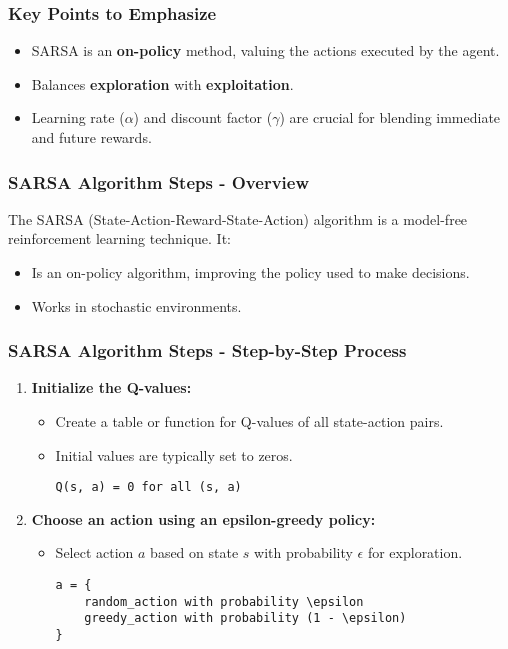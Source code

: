 \documentclass{beamer}
\begin{document}
\begin{frame}[fragile]
    \frametitle{Key Points to Emphasize}
    \begin{itemize}
        \item SARSA is an \textbf{on-policy} method, valuing the actions executed by the agent.
        \item Balances \textbf{exploration} with \textbf{exploitation}.
        \item Learning rate ($\alpha$) and discount factor ($\gamma$) are crucial for blending immediate and future rewards.
    \end{itemize}
\end{frame}

\begin{frame}[fragile]
    \frametitle{SARSA Algorithm Steps - Overview}
    The SARSA (State-Action-Reward-State-Action) algorithm is a model-free reinforcement learning technique. It:
    \begin{itemize}
        \item Is an on-policy algorithm, improving the policy used to make decisions.
        \item Works in stochastic environments.
    \end{itemize}
\end{frame}

\begin{frame}[fragile]
    \frametitle{SARSA Algorithm Steps - Step-by-Step Process}
    \begin{enumerate}
        \item \textbf{Initialize the Q-values:}
            \begin{itemize}
                \item Create a table or function for Q-values of all state-action pairs.
                \item Initial values are typically set to zeros.
                \begin{lstlisting}
Q(s, a) = 0 for all (s, a)
                \end{lstlisting}
            \end{itemize}
        \item \textbf{Choose an action using an epsilon-greedy policy:}
            \begin{itemize}
                \item Select action $a$ based on state $s$ with probability $\epsilon$ for exploration.
                \begin{lstlisting}
a = {
    random_action with probability \epsilon
    greedy_action with probability (1 - \epsilon)
}
                \end{lstlisting}
            \end{itemize}
    \end{enumerate}
\end{frame}
\end{document}
